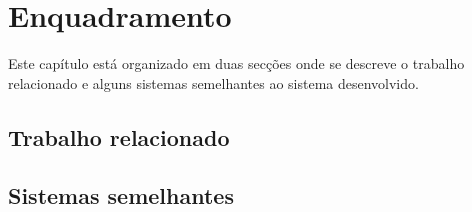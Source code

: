%
%
\chapter{Enquadramento} \label{cap:enquadramento}

Este capítulo está organizado em duas secções onde se descreve o trabalho relacionado e alguns sistemas semelhantes ao sistema desenvolvido.

\section{Trabalho relacionado}
\lipsum[1-2]

\section{Sistemas semelhantes}
\lipsum[3-5]
